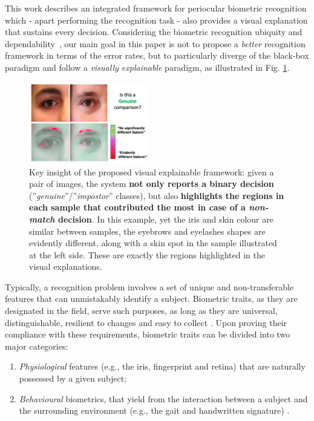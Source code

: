 \documentclass[final]{cvpr}
\begin{document}
This work describes an integrated framework for periocular biometric recognition which - apart performing the recognition task - also provides a visual explanation that sustains every decision. Considering the biometric recognition ubiquity and dependability~\cite{demand_for_interpretability}, our main goal in this paper is not to propose a \emph{better} recognition framework in terms of the error rates, but to particularly diverge of the black-box paradigm and follow a \emph{visually explainable} paradigm, as illustrated in Fig. \ref{fig:interpretable_explanation}.

\begin{figure}[H]
  \begin{center}
  \includegraphics[width=0.47\textwidth]{figures/figure_1_nv2.pdf}
  \caption{Key insight of the proposed visual explainable framework:  given a pair of images, the system \textbf{not only reports a binary decision} (''\emph{genuine}''/''\emph{impostor}'' classes), but also \textbf{highlights the regions in each sample that contributed the most in case of a \emph{non-match} decision}. In this example, yet the iris and skin colour are similar between samples, the eyebrows and eyelashes shapes are evidently different, along with a skin spot in the sample illustrated at the left side. These are exactly the regions highlighted in the visual explanations.}
  \label{fig:interpretable_explanation}
  \end{center}
\end{figure}

Typically, a recognition problem involves a set of unique and non-transferable features that can unmistakably identify a subject. Biometric traits, as they are designated in the field, serve such purposes, as long as they are universal, distinguishable, resilient to changes and  easy to collect \cite{introduction_to_biometric_recognition}. Upon proving their compliance with these requirements, biometric traits can be divided into two major  categories: 

\begin{enumerate}
\item \textit{Physiological} features (e.g., the iris, fingerprint and retina) that are naturally possessed by a given subject; 
\item \textit{Behavioural} biometrics, that yield from the interaction between a subject and the surrounding environment (e.g., the gait and handwritten signature) \cite{biometric_recognition_dl_survey}.
\end{enumerate}
\end{document}
